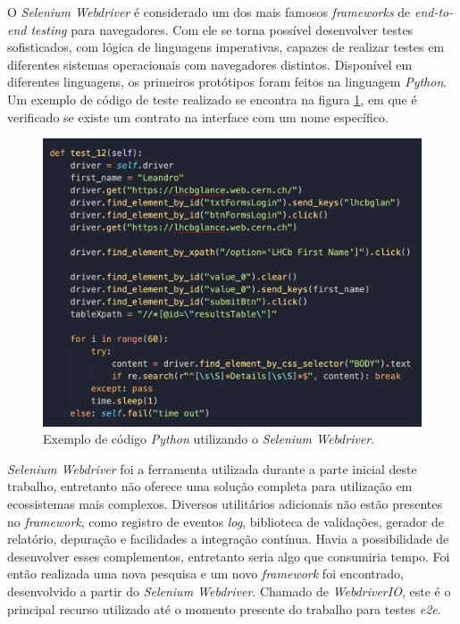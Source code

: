 O \emph{Selenium Webdriver} é considerado um dos mais famosos \emph{frameworks} de \emph{end-to-end testing} para navegadores. Com ele se torna possível desenvolver testes sofisticados, com lógica de linguagens imperativas, capazes de realizar testes em diferentes sistemas operacionais com navegadores distintos. Disponível em diferentes linguagens, os primeiros protótipos foram feitos na linguagem \emph{Python}. Um exemplo de código de teste realizado se encontra na figura \ref{fig:e2e-ferramenta-2}, em que é verificado se existe um contrato na interface com um nome específico.

\begin{figure}[H]
    \centering
    \includegraphics[width=13cm]{source/4-solucao/images/e2e-ferramenta-2.png}
    \caption{Exemplo de código \emph{Python} utilizando o \emph{Selenium Webdriver}.}
    \label{fig:e2e-ferramenta-2}
\end{figure}

\emph{Selenium Webdriver} foi a ferramenta utilizada durante a parte inicial deste trabalho, entretanto não oferece uma solução completa para utilização em ecossistemas mais complexos. Diversos utilitários adicionais não estão presentes no \emph{framework}, como registro de eventos \emph{log}, biblioteca de validações, gerador de relatório, depuração e facilidades a integração contínua. Havia a possibilidade de desenvolver esses complementos, entretanto seria algo que consumiria tempo. Foi então realizada uma nova pesquisa e um novo \emph{framework} foi encontrado, desenvolvido a partir do \emph{Selenium Webdriver}. Chamado de \emph{WebdriverIO}, este é o principal recurso utilizado até o momento presente do trabalho para testes \emph{e2e}.


